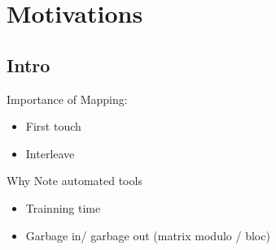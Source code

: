 \section{Motivations}
\label{sec:motivations}

\subsection{Intro}
\label{sec:motivations-intro}

Importance of Mapping:
\begin{itemize}
    \item First touch
    \item Interleave
\end{itemize}

Why Note automated tools
\begin{itemize}
    \item Trainning time
    \item Garbage in/ garbage out (matrix modulo / bloc)
\end{itemize}
